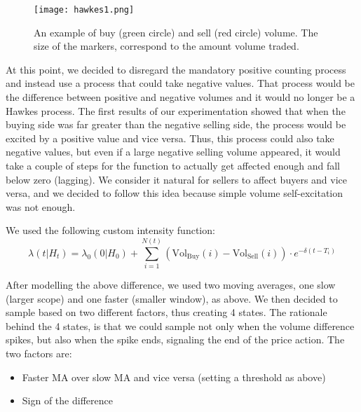 \begin{figure}[H]
    \centering
    \texttt{[image: hawkes1.png]}
    \caption{An example of buy (green circle) and sell (red circle) volume. The size of the markers, correspond to the amount volume traded.}
    \label{fig:hawkes1}
\end{figure}


At this point, we decided to disregard the mandatory positive counting process and instead use a process that could take negative values. That process would be the difference between positive and negative volumes and it would no longer be a Hawkes process. The first results of our experimentation showed that when the buying side was far greater than the negative selling side, the process would be excited by a positive value and vice versa. Thus, this process could also take negative values, but even if a large negative selling volume appeared, it would take a couple of steps for the function to actually get affected enough and fall below zero (lagging). We consider it natural for sellers to affect buyers and vice versa, and we decided to follow this idea because simple volume self-excitation was not enough.

We used the following custom intensity function: 
\[ \lambda(t|H_t) = \lambda_0(0|H_0) + \sum_{i=1}^{N(t)}(\text{Vol}_{\text{Buy}}(i) - \text{Vol}_{\text{Sell}}(i)) \cdot e^{-\delta(t-T_i)} \]

After modelling the above difference, we used two moving averages, one slow (larger scope) and one faster (smaller window), as above. We then decided to sample based on two different factors, thus creating 4 states. The rationale behind the 4 states, is that we could sample not only when the volume difference spikes, but also when the spike ends, signaling the end of the price action.
The two factors are:
\begin{itemize}
\item Faster MA over slow MA and vice versa (setting a threshold as above)
\item Sign of the difference 
\end{itemize}

